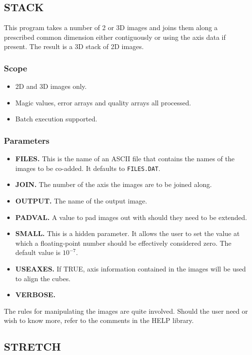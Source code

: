 \subsection{STACK}

This program takes a number of 2 or 3D images and joins them along a prescribed
common dimension either contiguously or using the axis data if present. The
result is a 3D stack of 2D images.

\subsubsection{Scope}

\begin{itemize}
\item 2D and 3D images only.
\item Magic values, error arrays and quality arrays all processed.
\item Batch execution supported.
\end{itemize}

\subsubsection{Parameters}

\begin{itemize}
\item {\bf FILES.} This is the name of an ASCII file that contains the names of
the images to be co-added. It defaults to {\tt FILES.DAT}.
\item {\bf JOIN.} The number of the axis the images are to be joined along.
\item {\bf OUTPUT.} The name of the output image.
\item {\bf PADVAL.} A value to pad images out with should they need to be
extended.
\item {\bf SMALL.} This is a hidden parameter. It allows the user to set the
value at which a floating-point number should be effectively considered zero.
The default value is $10^{-7}$.
\item {\bf USEAXES.} If TRUE, axis information contained in the images will be
used to align the cubes.
\item {\bf VERBOSE.}
\end{itemize}

The rules for manipulating the images are quite involved. Should the user need
or wish to know more, refer to the comments in the HELP library.

\subsection{STRETCH}

